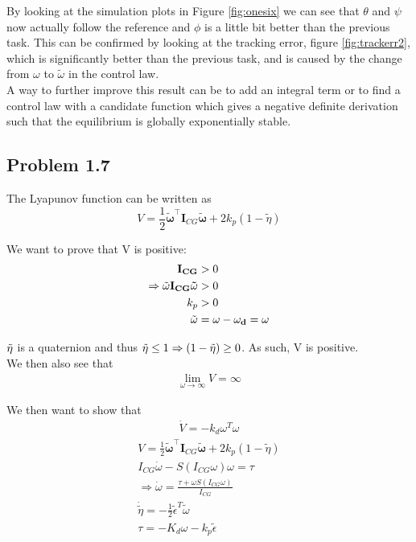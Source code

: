 By looking at the simulation plots in Figure \ref{fig:onesix} we can see that $\theta$ and $\psi$ now actually follow the reference and $\phi$ is a little bit better than the previous task. This can be confirmed by looking at the tracking error, figure \ref{fig:trackerr2}, which is significantly better than the previous task, and is caused by the change from $\omega$ to $\tilde{\omega}$ in the control law. \\
A way to further improve this result can be to add an integral term or to find a control law with a candidate function which gives a negative definite derivation such that the equilibrium is globally exponentially stable\cite{Khalil}. \\

\subsection*{Problem 1.7}
The Lyapunov function can be written as 
 \begin{equation}
	 V = \frac{1}{2} \tilde{\boldsymbol{\omega}}^{\top} \mathbf{I}_{CG}\tilde{\boldsymbol{\omega}} + 2 k_p (1-\tilde{\eta})
 \end{equation}

We want to prove that V is positive:
\begin{align}
    \bf{I}_{CG} &> 0 \\
    \Rightarrow \tilde{\bf{\omega}}\bf{I}_{CG}\tilde{\bf{\omega}}&>0 \\
    k_p &> 0 \\ 
    \tilde{\bf{\omega}} &= \bf{\omega} - \bf{\omega_d} = \bf{\omega} \\
\end{align}

$\tilde{\bf{\eta}}$ is a quaternion and thus $\tilde{\bf{\eta}}\leq 1 \Rightarrow (1-\tilde{\bf{\eta}}) \geq 0 $. As such, V is positive. \\

We then also see that \\
\begin{align}
    \lim_{\omega \rightarrow \infty}V = \infty
\end{align}

We then want to show that
\begin{align}
    \dot{V} = -k_d\omega^T\omega
\end{align}
\begin{align}
     V = \frac{1}{2} \tilde{\boldsymbol{\omega}}^{\top} \mathbf{I}_{CG}\tilde{\boldsymbol{\omega}} + 2 k_p (1-\tilde{\eta}) \\
     I_{CG}\dot{\omega} - S(I_{CG}\omega)\omega = \tau \\
     \Rightarrow \dot{\omega} = \frac{\tau + \omega S(I_{CG}\omega)}{I_{CG}} \\
     \dot{\tilde{\eta}} = -\frac{1}{2}\tilde{\epsilon}^T\tilde{\omega} \\
     \tau = -K_d\omega - k_p\tilde{\epsilon} \\
\end{align}

